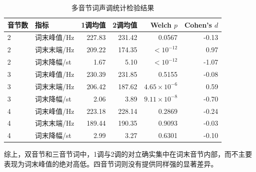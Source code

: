 \begin{table}[H]
\centering
\caption{多音节词声调统计检验结果}
\label{tab:poly-tests}
\begin{tabular}{llrrrr}
\toprule
音节数 & 指标 & 1调均值 & 2调均值 & Welch $p$ & Cohen's $d$ \\
\midrule
2 & 词末峰值/Hz & 227.83 & 231.42 & 0.0567 & -0.13 \\
2 & 词末末端/Hz & 209.22 & 174.35 & $<10^{-12}$ & 0.97 \\
2 & 词末降幅/st & 1.67 & 5.10 & $<10^{-12}$ & -1.07 \\
3 & 词末峰值/Hz & 230.39 & 231.85 & 0.5155 & -0.08 \\
3 & 词末末端/Hz & 206.42 & 187.62 & $4.65\times10^{-6}$ & 0.59 \\
3 & 词末降幅/st & 2.06 & 3.89 & $9.11\times10^{-8}$ & -0.70 \\
4 & 词末峰值/Hz & 223.18 & 228.14 & 0.2869 & -0.24 \\
4 & 词末末端/Hz & 189.44 & 190.35 & 0.9093 & -0.03 \\
4 & 词末降幅/st & 2.99 & 3.27 & 0.6301 & -0.10 \\
\bottomrule
\end{tabular}
\end{table}

综上，双音节和三音节词中，1调与2调的对立确实集中在词末音节内部，而不主要表现为词末峰值的绝对高低。四音节词则没有提供同样强的显著差异。